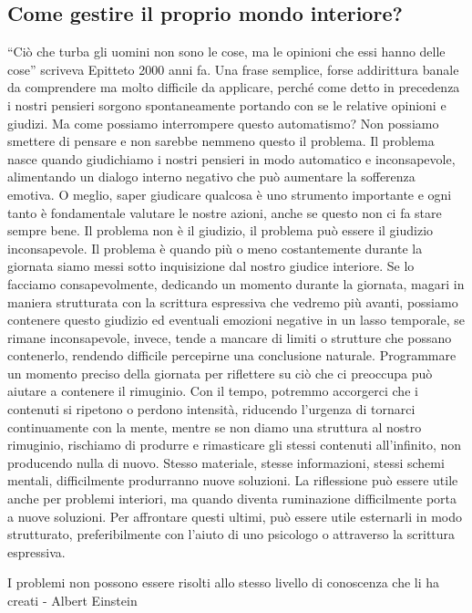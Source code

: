 \documentclass[12pt]{book} %
\begin{document}
\subsection{Come gestire il proprio mondo interiore?}
“Ciò che turba gli uomini non sono le cose, ma le opinioni che essi hanno delle cose” scriveva Epitteto 2000 anni fa.
Una frase semplice, forse addirittura banale da comprendere ma molto difficile da applicare, perché come detto in precedenza i
nostri pensieri sorgono spontaneamente portando con se le relative opinioni e giudizi. Ma come possiamo interrompere
questo automatismo? Non possiamo smettere di pensare e non sarebbe nemmeno questo il problema. 
Il problema nasce quando giudichiamo i nostri pensieri in modo automatico e inconsapevole, alimentando un dialogo interno negativo che può aumentare la sofferenza emotiva. O meglio, saper giudicare qualcosa è uno strumento importante e ogni tanto è
fondamentale valutare le nostre azioni, anche se questo non ci fa stare sempre bene. Il problema non è il giudizio, il
problema può essere il giudizio inconsapevole. Il problema è quando più o meno costantemente durante la giornata siamo messi
sotto inquisizione dal nostro giudice interiore. Se lo facciamo consapevolmente, dedicando un momento durante la
giornata, magari in maniera strutturata con la scrittura espressiva che vedremo più avanti, possiamo contenere questo
giudizio ed eventuali emozioni negative in un lasso temporale, se rimane inconsapevole, invece, tende a mancare di limiti o strutture che possano contenerlo, rendendo difficile percepirne una conclusione naturale. Programmare un momento preciso della giornata per riflettere su ciò che ci preoccupa può aiutare a contenere il rimuginio. Con il tempo, potremmo accorgerci che i contenuti si ripetono o perdono intensità, riducendo l’urgenza di tornarci continuamente con la mente, mentre se non diamo una struttura al nostro rimuginio, rischiamo di produrre
e rimasticare gli stessi contenuti all'infinito, non producendo nulla di nuovo. Stesso materiale,
stesse informazioni, stessi schemi mentali, difficilmente produrranno nuove soluzioni. 
La riflessione può essere utile anche per problemi interiori, ma quando diventa ruminazione difficilmente porta a nuove soluzioni. Per affrontare questi ultimi, può essere utile esternarli in modo strutturato, preferibilmente con l’aiuto di uno psicologo o attraverso la scrittura espressiva.

I problemi non possono essere risolti allo stesso livello di conoscenza che li ha creati - Albert Einstein
\end{document}
